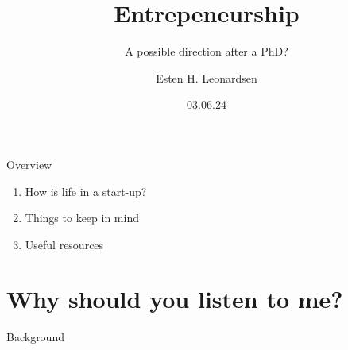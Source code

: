 \documentclass[10pt]{beamer}
\title{Entrepeneurship}
\subtitle{A possible direction after a PhD?}
\author{Esten H. Leonardsen}
\date{03.06.24}
\begin{document}
	\begin{frame}
	 	\titlepage
	\end{frame}

    \begin{frame}{Overview}
        \begin{enumerate}
            \item How is life in a start-up?
            \item Things to keep in mind
            \item Useful resources
        \end{enumerate}
    \end{frame}

    \section{Why should you listen to me?}

    \begin{frame}{Background}
        \centering
    \end{frame}
\end{document}
